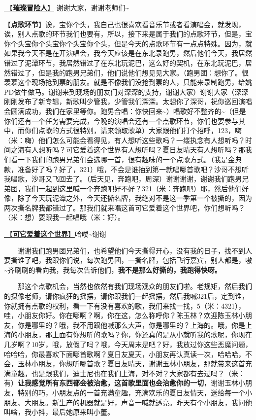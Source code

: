 \documentclass[]{ctexbook}
\begin{document}
\hyperref[adventurers]{🎵【\textbf{璀璨冒险人}】} 谢谢大家，谢谢老师们\textasciitilde{}

【\textbf{点歌环节}】诶，宝你个头，我自己也很喜欢看音乐节或者看演唱会，就发现，诶，别人点歌的环节我们也要有，所以，接下来是属于我们的点歌环节，但是，宝你个头宝你个头宝你个头宝你个头，但是今天的点歌环节有一点点特殊。因为，就如果我今天不是在开演唱会，我今天应该是在东北录跑男，然后他们今天，我居然错过了泥潭环节，我居然错过了在东北玩泥巴，这么好的契机，在东北玩泥巴，居然错过了，但是我的跑男兄弟们，他们说他们想见见大家。（跑男团：想你了。很羡慕这个现场抢到票的朋友。就是不像我们没抢到票的人，只能来录制跑男，给姚PD做牛做马。谢谢来到现场的朋友们对深深的支持，谢谢大家）谢谢大家（深深刚刚发布了新专辑，新歌叫少管我，少管我们深深。太想你了深哥，祝你巡回演唱会圆满成功，我们在家里等你。跑男合唱：你快回来\textasciitilde）唱歌好不整齐的\textasciitilde（但是你们还有一个任务需要完成，今晚的演唱会还有一个点歌环节，你们也要参与其中，而你们点歌的方式很特别，请来领取歌单）大家跟他们打个招呼，123，嗨（米：嗨）他们怎么可能会看得见，有人想听这些歌吗？一缕执念有人想听吗？时间之海有人想听吗？可它爱着这个世界有人想听吗？夏日友晴天有人想听吗？那我们看一下我们的跑男兄弟们会选哪一首，很有趣味的一个点歌方式。（我是金典款，准备好了吗？好了，321）哦，不会是谁抽到第一就唱哪首歌吧？沙哥不想听我唱歌，沙哥又飞回去了。（后天见，奔跑吧，周深）谢谢谢谢，谢谢我们跑男兄弟团，我们一起到这里喊一个奔跑吧好不好？321（米：奔跑吧）耶，然后他们好像，除了今天玩泥潭之外，今天还撕名牌，我绝对不是这一季第一个被撕的，因为两次撕名牌我都错过了。那我们就来唱这首可它爱着这个世界吧，你们想听吗？（米：想）要跟我一起唱哦（米：好）。

\hyperref[love-the-world]{🎵【\textbf{可它爱着这个世界}】}哈喽\textasciitilde 谢谢

  谢谢我们跑男团兄弟们，也希望他们今天撕得开心，没有我的日子，找不到人要撕谁了吧，我跟你们说，每次跑男团，一撕名牌，包括飞行嘉宾，别人都是，嗷\textasciitilde 齐刷刷的看向我，我每次告诉他们，\textbf{我不是那么好撕的，我跑得快呀。}

  那这个点歌机会，当然也依然有我们现场观众的朋友们啦。老规矩，然后我们的摄像老师，请你疯狂的摇摆，请你跟我们一起摇摆，然后我喊321后，定到谁，你就拥有点歌的权利，看一下有没有喜欢的歌，我们来找一找，5（米：4321），哇，小朋友你好。你在哪啊？啊，你在这，怎么称呼你？陈玉林？欢迎陈玉林小朋友，你是哪里的？哦，我不用跟他喊那么大声，你是哪里的？上海的。哦，你是上海的小朋友，那上面有你想听的歌吗？你，你还真的是从小就听我的歌呢，你现在几岁啊？10岁，哦，放假了吗？哦，今天周末是吧？好，我放过你这些恶魔问题，哈哈哈，你最喜欢下面哪首歌啊？夏日友夏天，小朋友再认真读一次，哈哈哈，不会，玉林小朋友，你想听哪首歌？夏日友晴天，谢谢玉林小朋友，那就带来这首充满童趣，也是跟我们，迪士尼也在我们上海，对不对？大家都有去过吗？（米：有）\textbf{让我感觉所有东西都会被治愈，这首歌里面也会治愈你的一切}，谢谢玉林小朋友，特别的巧，小朋友点的一首充满童趣，充满欢乐的夏日友情天，送给每一个小朋友、大朋友。新生产的机器就是好，声音一喊就透亮。昨天有个小朋友，我问他叫啥，我小抖，最后她原来叫小董。
\end{document}
